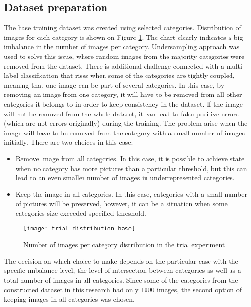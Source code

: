     \subsection{Dataset preparation}
    \label{sec:trial-dataset-prep}
    The base training dataset was created using selected categories. Distribution of images for each category is shown on Figure \ref{fig:trial-distribution-base}. The chart clearly indicates a big imbalance in the number of images per category. Undersampling approach was used to solve this issue, where random images from the majority categories were removed from the dataset. There is additional challenge connected with a multi-label classification that rises when some of the categories are tightly coupled, meaning that one image can be part of several categories. In this case, by removing an image from one category, it will have to be removed from all other categories it belongs to in order to keep consistency in the dataset. If the image will not be removed from the whole dataset, it can lead to false-positive errors (which are not errors originally) during the training. The problem arise when the image will have to be removed from the category with a small number of images initially. There are two choices in this case:
    
    \begin{itemize}
        \item Remove image from all categories. In this case, it is possible to achieve state when no category has more pictures than a particular threshold, but this can lead to an even smaller number of images in underrepresented categories.
        \item Keep the image in all categories. In this case, categories with a small number of pictures will be preserved, however, it can be a situation when some categories size exceeded specified threshold.
    \end{itemize}
    
    \begin{figure}[h!]
        \centering
        \texttt{[image: trial-distribution-base]}
        \caption{Number of images per category distribution in the trial experiment}
        \label{fig:trial-distribution-base}
    \end{figure}
    
    The decision on which choice to make depends on the particular case with the specific imbalance level, the level of intersection between categories as well as a total number of images in all categories. Since some of the categories from the constructed dataset in this research had only 1000 images, the second option of keeping images in all categories was chosen.
    
